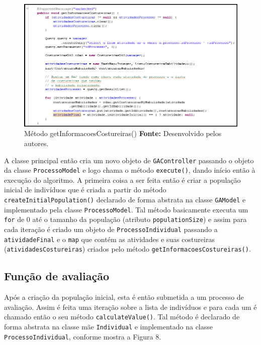 \begin{figure}[h!]
	\centerline{\includegraphics[scale=0.7]{./imagens/metodo_informacoes_costureiras.png}}
	\caption[Distribuição de lotes]
	{Método getInformacoesCostureiras() \textbf{Fonte:} Desenvolvido pelos
	autores.}
	\label{fig:exemplo1}
\end{figure}



\par A classe principal então cria um novo objeto de \texttt{GAController} passando o objeto da classe \texttt{ProcessoModel} e
logo chama o método \texttt{execute()}, dando início então à execução do
algoritmo. A primeira coisa a ser feita então é criar a população inicial de indivíduos que é criada a 
partir do método \texttt{createInitialPopulation()} declarado de forma 
abstrata na classe \texttt{GAModel} e implementado pela classe \texttt{ProcessoModel}. Tal método basicamente executa um 
\texttt{for} de 0 até o tamanho da população (atributo \texttt{populationSize})
e assim para cada iteração é criado um objeto de \texttt{ProcessoIndividual} passando a \texttt{atividadeFinal} e o 
\texttt{map} que contém as atividades e suas costureiras
(\texttt{atividadesCostureiras}) criados pelo método \texttt{getInformacoesCostureiras()}.



\subsection{Função de avaliação}

\par Após a criação da população inicial, esta é então submetida a um processo
de avaliação. Assim é feita uma iteração sobre a lista de indivíduos e para cada um é chamado então o seu método 
\texttt{calculateValue()}. Tal método é declarado de forma abstrata na classe mãe
\texttt{Individual} e implementado na classe \texttt{ProcessoIndividual}, conforme mostra a Figura 8.

